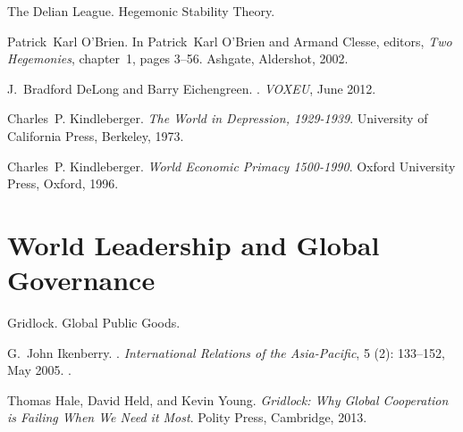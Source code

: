 \documentclass[%
 11pt%
]{article}
\begin{document}
The Delian League.
Hegemonic Stability Theory.

\nocite{O'Brien-PK-Pax-Britannica-2002}
\nocite{DeLong-JB+Eichengreen-B-New-Preface-Kindleberger-2012}
\nocite{Kindleberger-C-World-Depression-1973}
\nocite{Kindleberger-C-World-Economic-Primacy-1996}

\bigskip
Patrick~Karl O'Brien.
\newblock In Patrick~Karl O'Brien and Armand Clesse, editors, \emph{Two
  Hegemonies}, chapter~1, pages 3--56. Ashgate, Aldershot, 2002.
\medskip

J.~Bradford DeLong and Barry Eichengreen.
.
\newblock \emph{VOXEU}, June 2012.
\medskip

Charles~P. Kindleberger.
\newblock \emph{{The World in Depression, 1929-1939}}.
\newblock University of California Press, Berkeley, 1973.
\medskip

Charles~P. Kindleberger.
\newblock \emph{{World Economic Primacy 1500-1990}}.
\newblock Oxford University Press, Oxford, 1996.
\medskip


\section{World Leadership and Global Governance}

Gridlock.
Global Public Goods.

\nocite{Ikenberry-GJ-Power+Liberal-Order-2005}
\nocite{Han-H-Kikuchi-T-Global-Public-Goods-2014}
\nocite{Hale-T-Held-D-Young-K-Gridlock-2013}
\nocite{Alesina-A-Spolaore-E-Number-Size-Nations-1997}

\bigskip
G.~John Ikenberry.
.
\newblock \emph{International Relations of the Asia-Pacific}, 5
  (2): 133--152, May 2005.
.
\medskip

Thomas Hale, David Held, and Kevin Young.
\newblock \emph{{Gridlock: Why Global Cooperation is Failing When We Need it
  Most}}.
\newblock Polity Press, Cambridge, 2013.
\medskip
\end{document}
